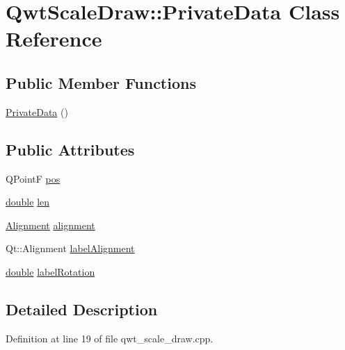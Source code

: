 \hypertarget{class_qwt_scale_draw_1_1_private_data}{\section{Qwt\-Scale\-Draw\-:\-:Private\-Data Class Reference}
\label{class_qwt_scale_draw_1_1_private_data}
}
\subsection*{Public Member Functions}
\begin{DoxyCompactItemize}
\item 
\hyperlink{class_qwt_scale_draw_1_1_private_data_a6fc3d6742611ec35c24a60b6a23e02b1}{Private\-Data} ()
\end{DoxyCompactItemize}
\subsection*{Public Attributes}
\begin{DoxyCompactItemize}
\item 
Q\-Point\-F \hyperlink{class_qwt_scale_draw_1_1_private_data_a24d5c1e8eca8cf34248cbaf01dfd4b78}{pos}
\item 
\hyperlink{_super_l_u_support_8h_a8956b2b9f49bf918deed98379d159ca7}{double} \hyperlink{class_qwt_scale_draw_1_1_private_data_a006435ca5b680e5be02ab9973694be8b}{len}
\item 
\hyperlink{class_qwt_scale_draw_acd7ceeeac592ef08530788580b461c66}{Alignment} \hyperlink{class_qwt_scale_draw_1_1_private_data_a3b0b028194811ebf3b2de5e44b71fab9}{alignment}
\item 
Qt\-::\-Alignment \hyperlink{class_qwt_scale_draw_1_1_private_data_a7f2ac7888e1b705295e03ea426a0bef4}{label\-Alignment}
\item 
\hyperlink{_super_l_u_support_8h_a8956b2b9f49bf918deed98379d159ca7}{double} \hyperlink{class_qwt_scale_draw_1_1_private_data_a7b221a8d3ced4826d98d745d61f87d9b}{label\-Rotation}
\end{DoxyCompactItemize}


\subsection{Detailed Description}


Definition at line 19 of file qwt\-\_\-scale\-\_\-draw.\-cpp.



